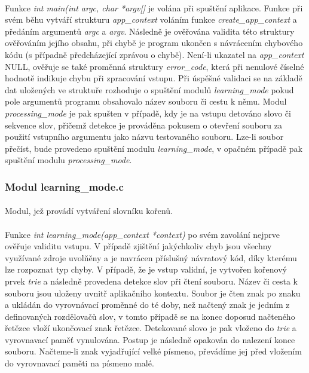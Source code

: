 ﻿\documentclass[12pt, a4paper]{article}
\begin{document}
\paragraph{}
Funkce \textit{int main(int argc, char *argv[]} je volána při spuštění aplikace. Funkce při svém běhu vytváří strukturu \textit{app\_context} voláním funkce \textit{create\_app\_context} a předáním argumentů \textit{argc} a \textit{argv}. Následně je ověřována validita této struktury ověřováním jejího obsahu, při chybě je program ukončen s návrácením chybového kódu (s případně předcházející zprávou o chybě). Není-li ukazatel na \textit{app\_context} NULL, ověřuje se také proměnná struktury \textit{error\_code}, která při nenulové číselné hodnotě indikuje chybu při zpracování vstupu. Při úspěšné validaci se na základě dat uložených ve struktuře rozhoduje o spuštění modulů \textit{learning\_mode} pokud pole argumentů programu obsahovalo název souboru či cestu k němu. Modul \textit{processing\_mode} je pak spušten v případě, kdy je na vstupu detováno slovo či sekvence slov, přičemž detekce je prováděna pokusem o otevření souboru za použití vstupního argumentu jako názvu testovaného souboru. Lze-li soubor přečíst, bude provedeno spuštění modulu \textit{learning\_mode}, v opačném případě pak spuštění modulu \textit{processing\_mode}.  
 
\subsubsection{Modul learning\_mode.c}
\paragraph{}
Modul, jež provádí vytváření slovníku kořenů. 

\paragraph{}
Funkce \textit{int learning\_mode(app\_context *context)} po svém zavolání nejprve ověřuje validitu vstupu. V případě zjištění jakýchkoliv chyb jsou všechny využívané zdroje uvolňěny a je navrácen příslušný návratový kód, díky kterému lze rozpoznat typ chyby. V případě, že je vstup validní, je vytvořen kořenový prvek \textit{trie} a následně provedena detekce slov při čtení souboru. Název či cesta k souboru jsou uloženy uvnitř aplikačního kontextu. Soubor je čten znak po znaku a ukládán do vyrovnávací proměnné do té doby, než načtený znak je jedním z definovaných rozdělovačů slov, v tomto případě se na konec doposud načteného řetězce vloží ukončovací znak řetězce. Detekované slovo je pak  vloženo do \textit{trie} a vyrovnavací paměť vynulována. Postup je následně opakován do nalezení konce souboru. Načteme-li znak vyjadřující velké písmeno, převádíme jej před vložením do vyrovnavací paměti na písmeno malé.
\end{document}
